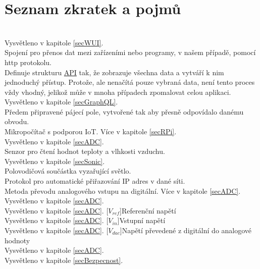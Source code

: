 \documentclass[czech,12pt,a4paper]{article}
\begin{document}
\section{Seznam zkratek a pojmů} \label{secAcronyms}
\begin{acronym}
	 \\
		Vysvětleno v kapitole \underline{\ref{secWUI}}.
	 \\
		Spojení pro přenos dat mezi zařízeními nebo programy, v našem případě, pomocí http protokolu.
	 \\
		Definuje strukturu \underline{\ac{API}} tak, že zobrazuje všechna data a vytváří k nim jednoduchý přístup. Protože, ale nenačítá pouze vybraná data, není tento proces vždy vhodný, jelikož může v mnoha případech zpomalovat celou aplikaci. 
	 \\
		Vysvětleno v kapitole \underline{\ref{secGraphQL}}.
	 \\ 
		Předem připravené pájecí pole, vytvořené tak aby přesně odpovídalo danému obvodu.
	 \\ 
		Mikropočítač s podporou IoT. Více v kapitole \underline{\ref{secRPi}}.
	 \\ 
		Vysvětleno v kapitole \underline{\ref{secADC}}.
	 \\ 
		Senzor pro čtení hodnot teploty a vlhkosti vzduchu.
	 \\ 
		Vysvětleno v kapitole \underline{\ref{secSonic}}.
	 \\ 
		Polovodičová součástka vyzařující světlo.
	 \\ 
		Protokol pro automatické přiřazování IP adres v dané síti.
	 \\ 
		Metoda převodu analogového vstupu na digitální. Více v kapitole \underline{\ref{secADC}}.
	 \\ 
		Vysvětleno v kapitole \underline{\ref{secADC}}.
	 \\ 
		Vysvětleno v kapitole \underline{\ref{secADC}}.
	[$ V_{ref}$]{Referenční napětí} \\ 
		Vysvětleno v kapitole \underline{\ref{secADC}}.
	[$ V_{in}$]{Vstupní napětí} \\ 
		Vysvětleno v kapitole \underline{\ref{secADC}}.
	[$ V_{dac}$]{Napětí převedené z digitální do analogové hodnoty} \\ 
		Vysvětleno v kapitole \underline{\ref{secADC}}.
	 \\ 
		Vysvětleno v kapitole \underline{\ref{secBezpecnost}}.
\end{acronym}
\end{document}
